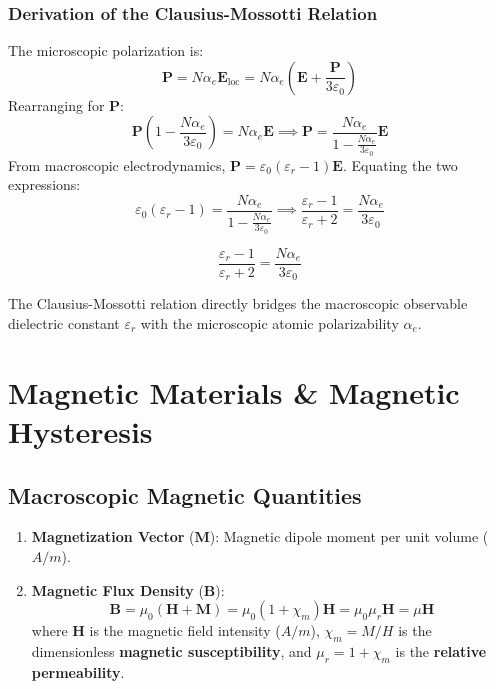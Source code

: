 \subsubsection{Derivation of the Clausius-Mossotti Relation}
The microscopic polarization is:
\begin{equation}
    \mathbf{P} = N \alpha_e \mathbf{E}_{\text{loc}} = N \alpha_e \left( \mathbf{E} + \frac{\mathbf{P}}{3\varepsilon_0} \right)
\end{equation}
Rearranging for $\mathbf{P}$:
\begin{equation}
    \mathbf{P}\left( 1 - \frac{N\alpha_e}{3\varepsilon_0} \right) = N\alpha_e \mathbf{E} \implies \mathbf{P} = \frac{N\alpha_e}{1 - \frac{N\alpha_e}{3\varepsilon_0}}\mathbf{E}
\end{equation}
From macroscopic electrodynamics, $\mathbf{P} = \varepsilon_0(\varepsilon_r - 1)\mathbf{E}$. Equating the two expressions:
\begin{equation}
    \varepsilon_0(\varepsilon_r - 1) = \frac{N\alpha_e}{1 - \frac{N\alpha_e}{3\varepsilon_0}} \implies \frac{\varepsilon_r - 1}{\varepsilon_r + 2} = \frac{N\alpha_e}{3\varepsilon_0}
\end{equation}

\begin{keyequation}
\begin{equation}
    \frac{\varepsilon_r - 1}{\varepsilon_r + 2} = \frac{N\alpha_e}{3\varepsilon_0}
\end{equation}
\end{keyequation}
The Clausius-Mossotti relation directly bridges the macroscopic observable dielectric constant $\varepsilon_r$ with the microscopic atomic polarizability $\alpha_e$.

\section{Magnetic Materials \& Magnetic Hysteresis}

\subsection{Macroscopic Magnetic Quantities}
\begin{enumerate}
    \item \textbf{Magnetization Vector} ($\mathbf{M}$): Magnetic dipole moment per unit volume ($\si{A/m}$).
    \item \textbf{Magnetic Flux Density} ($\mathbf{B}$):
    \begin{equation}
        \mathbf{B} = \mu_0(\mathbf{H} + \mathbf{M}) = \mu_0(1 + \chi_m)\mathbf{H} = \mu_0 \mu_r \mathbf{H} = \mu \mathbf{H}
    \end{equation}
    where $\mathbf{H}$ is the magnetic field intensity ($\si{A/m}$), $\chi_m = M/H$ is the dimensionless \textbf{magnetic susceptibility}, and $\mu_r = 1 + \chi_m$ is the \textbf{relative permeability}.
\end{enumerate}

